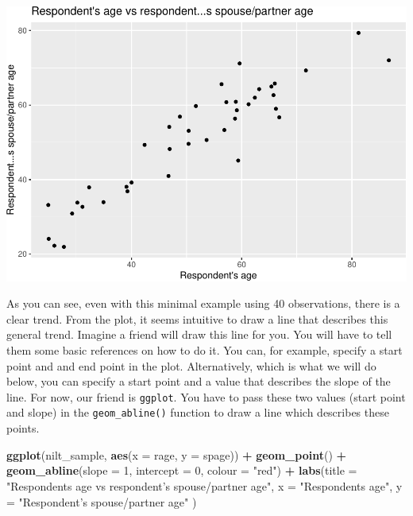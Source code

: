 \documentclass[
]{book}
\newenvironment{Shaded}{\begin{snugshade}}{\end{snugshade}}
\newcommand{\AttributeTok}[1]{\textcolor[rgb]{0.13,0.29,0.53}{#1}}
\newcommand{\DecValTok}[1]{\textcolor[rgb]{0.00,0.00,0.81}{#1}}
\newcommand{\FunctionTok}[1]{\textcolor[rgb]{0.13,0.29,0.53}{\textbf{#1}}}
\newcommand{\NormalTok}[1]{#1}
\newcommand{\SpecialCharTok}[1]{\textcolor[rgb]{0.81,0.36,0.00}{\textbf{#1}}}
\newcommand{\StringTok}[1]{\textcolor[rgb]{0.31,0.60,0.02}{#1}}
\begin{document}
\begin{flushleft}\includegraphics[width=1\linewidth]{lab-workbook_files/figure-latex/unnamed-chunk-85-1} \end{flushleft}

As you can see, even with this minimal example using 40 observations, there is a clear trend. From the plot, it seems intuitive to draw a line that describes this general trend. Imagine a friend will draw this line for you. You will have to tell them some basic references on how to do it. You can, for example, specify a start point and and end point in the plot. Alternatively, which is what we will do below, you can specify a start point and a value that describes the slope of the line. For now, our friend is \texttt{ggplot}. You have to pass these two values (start point and slope) in the \texttt{geom\_abline()} function to draw a line which describes these points.

\begin{Shaded}
\begin{Highlighting}[]
\FunctionTok{ggplot}\NormalTok{(nilt\_sample, }\FunctionTok{aes}\NormalTok{(}\AttributeTok{x =}\NormalTok{ rage, }\AttributeTok{y =}\NormalTok{ spage)) }\SpecialCharTok{+} 
  \FunctionTok{geom\_point}\NormalTok{() }\SpecialCharTok{+}
  \FunctionTok{geom\_abline}\NormalTok{(}\AttributeTok{slope =} \DecValTok{1}\NormalTok{, }\AttributeTok{intercept =} \DecValTok{0}\NormalTok{, }\AttributeTok{colour =} \StringTok{"red"}\NormalTok{) }\SpecialCharTok{+}
  \FunctionTok{labs}\NormalTok{(}\AttributeTok{title =} \StringTok{"Respondent\textquotesingle{}s age vs respondent’s spouse/partner age"}\NormalTok{, }
       \AttributeTok{x =} \StringTok{"Respondent\textquotesingle{}s age"}\NormalTok{, }\AttributeTok{y =} \StringTok{"Respondent’s spouse/partner age"}\NormalTok{ )}
\end{Highlighting}
\end{Shaded}
\end{document}
